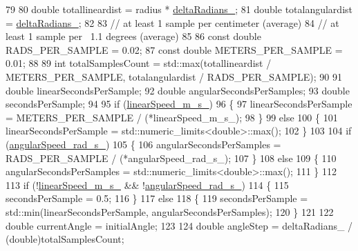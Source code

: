 \begin{DoxyCode}
79 
80         \textcolor{keywordtype}{double} totallineardist = radius * \hyperlink{classcl__move__group__interface_1_1CbCircularPivotMotion_afade33f1182615c64ea972075bfd2b95}{deltaRadians\_};
81         \textcolor{keywordtype}{double} totalangulardist = \hyperlink{classcl__move__group__interface_1_1CbCircularPivotMotion_afade33f1182615c64ea972075bfd2b95}{deltaRadians\_};
82 
83         \textcolor{comment}{// at least 1 sample per centimeter (average)}
84         \textcolor{comment}{// at least 1 sample per ~1.1 degrees (average)}
85 
86         \textcolor{keyword}{const} \textcolor{keywordtype}{double} RADS\_PER\_SAMPLE = 0.02;
87         \textcolor{keyword}{const} \textcolor{keywordtype}{double} METERS\_PER\_SAMPLE = 0.01;
88 
89         \textcolor{keywordtype}{int} totalSamplesCount = std::max(totallineardist / METERS\_PER\_SAMPLE, totalangulardist / 
      RADS\_PER\_SAMPLE);
90 
91         \textcolor{keywordtype}{double} linearSecondsPerSample;
92         \textcolor{keywordtype}{double} angularSecondsPerSamples;
93         \textcolor{keywordtype}{double} secondsPerSample;
94 
95         \textcolor{keywordflow}{if} (\hyperlink{classcl__move__group__interface_1_1CbCircularPivotMotion_adf6f6bc7a7a55f5c3dff80475e33c2e3}{linearSpeed\_m\_s\_})
96         \{
97             linearSecondsPerSample = METERS\_PER\_SAMPLE / (*linearSpeed\_m\_s\_);
98         \}
99         \textcolor{keywordflow}{else}
100         \{
101             linearSecondsPerSample = std::numeric\_limits<double>::max();
102         \}
103 
104         \textcolor{keywordflow}{if} (\hyperlink{classcl__move__group__interface_1_1CbCircularPivotMotion_a39fa383804d82285e07fa1c5a37cc587}{angularSpeed\_rad\_s\_})
105         \{
106             angularSecondsPerSamples = RADS\_PER\_SAMPLE / (*angularSpeed\_rad\_s\_);
107         \}
108         \textcolor{keywordflow}{else}
109         \{
110             angularSecondsPerSamples = std::numeric\_limits<double>::max();
111         \}
112 
113         \textcolor{keywordflow}{if} (!\hyperlink{classcl__move__group__interface_1_1CbCircularPivotMotion_adf6f6bc7a7a55f5c3dff80475e33c2e3}{linearSpeed\_m\_s\_} && !\hyperlink{classcl__move__group__interface_1_1CbCircularPivotMotion_a39fa383804d82285e07fa1c5a37cc587}{angularSpeed\_rad\_s\_})
114         \{
115             secondsPerSample = 0.5;
116         \}
117         \textcolor{keywordflow}{else}
118         \{
119             secondsPerSample = std::min(linearSecondsPerSample, angularSecondsPerSamples);
120         \}
121 
122         \textcolor{keywordtype}{double} currentAngle = initialAngle;
123 
124         \textcolor{keywordtype}{double} angleStep = deltaRadians\_ / (double)totalSamplesCount;

\end{DoxyCode}
